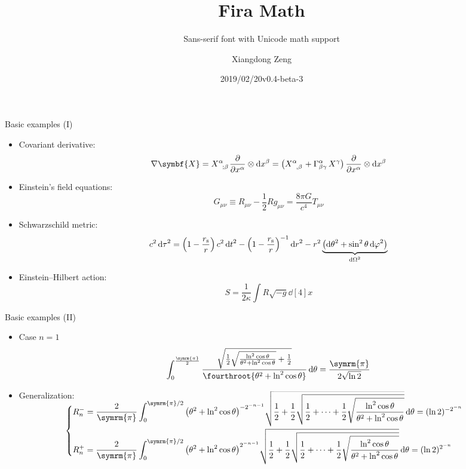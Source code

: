 \documentclass[aspectratio=169]{beamer}
\title{Fira Math}
\subtitle{Sans-serif font with Unicode math support}
\author{Xiangdong Zeng}
\date{2019/02/20\quad v0.4-beta-3}
\def\pp{\symrm{\pi}}
\begin{document}
\maketitle

\begin{frame}[noframenumbering]{Basic examples (I)}
\begin{itemize}
  \item Covariant derivative:
    \[
      \nabla \symbf{X} = \tensor{X}{^\alpha_{;\beta}} \pdv{x^\alpha} \otimes \dd{x^\beta}
                       = \qty(\tensor{X}{^\alpha_{,\beta}} + \Gamma^{\alpha}_{\beta\gamma} \, X^\gamma) \,
                         \pdv{x^\alpha} \otimes \dd{x^\beta}
    \]
  \item Einstein's field equations:
    \[ G_{\mu\nu} \equiv R_{\mu\nu} - \frac{1}{2} R g_{\mu\nu} = \frac{8\pi G}{c^4} T_{\mu\nu} \]
  \item Schwarzschild metric:
    \[
      c^2 \dd{\tau}^2 = \qty(1-\frac{r_{\mathrm{s}}}{r}) \, c^2 \dd{t}^2
                      - \qty(1-\frac{r_{\mathrm{s}}}{r})^{-1} \dd{r}^2
                      - r^2 \underbrace{\qty(\dd{\theta}^2 + \sin^2 \theta \dd{\varphi}^2)}_{\dd{\Omega}^2}
    \]
  \item Einstein--Hilbert action:
    \[ S = \frac{1}{2\kappa} \int R \sqrt{-g} \dd[4]{x} \]
\end{itemize}
\end{frame}

\begin{frame}[noframenumbering]{Basic examples (II)}
\begin{itemize}
  \item Case $n=1$
    \small
    \[
      \int_0^{\frac{\pp}{2}}
        \frac{\sqrt{\frac12 \sqrt{\frac{\ln^2\cos\theta}{\theta^2+\ln^2\cos\theta}} + \frac12}}%
            {\fourthroot{\theta^2 + \ln^2\cos\theta}} \dd{\theta}
      = \frac{\pp}{2\sqrt{\ln 2}}
    \]
  \item Generalization:
    \small\vspace{1ex}
    \[
      \begin{cases}
        \smash[t]{\displaystyle
          R_n^- = \frac{2}{\pp} \int_0^{\pp/2} \qty(\theta^2+\ln^2\cos\theta)^{-2^{-n-1}}
                  \sqrt{\frac12+\frac12\sqrt{\frac12+\cdots+\frac12\sqrt{
                        \frac{\ln^2\cos\theta}{\theta^2+\ln^2\cos\theta}}}} \dd{\theta}
                = (\ln 2)^{-2^{-n}}} \\[3ex]
        \smash[b]{\displaystyle
          R_n^+ = \frac{2}{\pp} \int_0^{\pp/2} \qty(\theta^2+\ln^2\cos\theta)^{2^{-n-1}}
                  \sqrt{\frac12+\frac12\sqrt{\frac12+\cdots+\frac12\sqrt{
                        \frac{\ln^2\cos\theta}{\theta^2+\ln^2\cos\theta}}}} \dd{\theta}
                = (\ln 2)^{2^{-n}}}
      \end{cases}
    \]
\end{itemize}
\end{frame}
\end{document}
